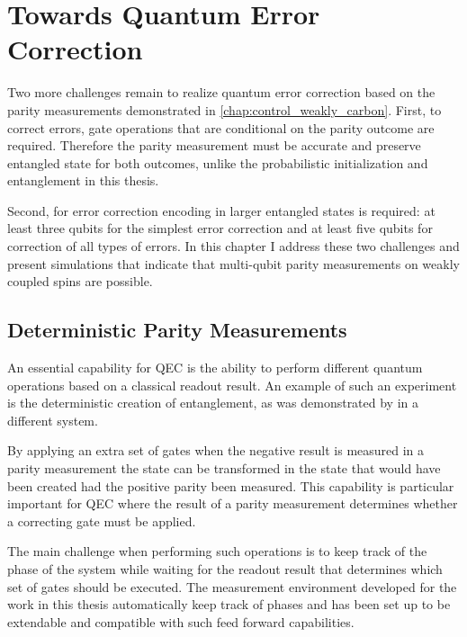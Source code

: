 \chapter{Towards Quantum Error Correction}
Two more challenges remain to realize quantum error correction based on the parity measurements demonstrated in \cref{chap:control_weakly_carbon}.
First, to correct errors, gate operations that are conditional on the parity outcome are required.
Therefore the parity measurement must be accurate and preserve entangled state for both outcomes, unlike the probabilistic initialization and entanglement in this thesis.

Second, for error correction encoding in larger entangled states is required: at least three qubits for the simplest error correction and at least five qubits for correction of all types of errors.
In this chapter I address these two challenges and present simulations that indicate that multi-qubit parity measurements on weakly coupled spins are possible.

\section{Deterministic Parity Measurements}

An essential capability for QEC is the ability to perform different quantum operations based on a classical readout result.
An example of such an experiment is the deterministic creation of entanglement, as was demonstrated by \citet{Riste2013Deterministic} in a different system.

By applying an extra set of gates when the negative result is measured in a parity measurement the state can be transformed in the state that would have been created had the positive parity been measured.
This capability is particular important for QEC where the result of a parity measurement determines whether a correcting gate must be applied.

The main challenge when performing such operations is to keep track of the phase of the system while waiting for the readout result that determines which set of gates should be executed.
The measurement environment developed for the work in this thesis automatically keep track of phases and has been set up to be extendable and compatible with such feed forward capabilities.



